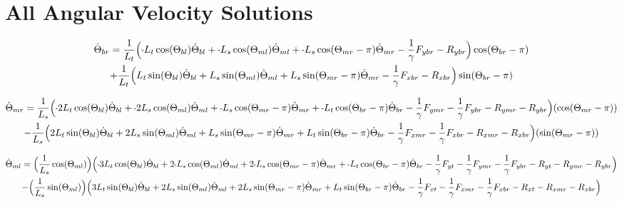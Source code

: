 \documentclass[11pt, landscape]{article}
\newcommand{\mn}{\scalebox{0.7}[1.0]{-}}
\begin{document}
\clearpage

\section{All Angular Velocity Solutions}

\begin{multline}
\dot{\Theta}_{br} =
\frac{1}{L_{t}}\Big(\mn L_{t}\cos(\Theta_{bl})\dot{\Theta}_{bl} + \mn L_{s}\cos(\Theta_{ml})\dot{\Theta}_{ml} + \mn L_{s}\cos(\Theta_{mr}-\pi)\dot{\Theta}_{mr} - \frac{1}{\gamma}F_{ybr} - R_{ybr} \Big)\cos(\Theta_{br}-\pi) \\
+ \frac{1}{L_{t}}\Big(L_{t}\sin(\Theta_{bl})\dot{\Theta}_{bl} + L_{s}\sin(\Theta_{ml})\dot{\Theta}_{ml} + L_{s}\sin(\Theta_{mr}-\pi)\dot{\Theta}_{mr} - \frac{1}{\gamma}F_{xbr} - R_{xbr} \Big)\sin(\Theta_{br}-\pi)
\end{multline}

\begin{multline}
\dot{\Theta}_{mr} =
\frac{1}{L_{s}} \Big(\mn 2L_{t}\cos(\Theta_{bl})\dot{\Theta}_{bl} + \mn 2L_{s}\cos(\Theta_{ml})\dot{\Theta}_{ml} + \mn L_{s}\cos(\Theta_{mr}-\pi)\dot{\Theta}_{mr} + \mn L_{t}\cos(\Theta_{br}-\pi)\dot{\Theta}_{br}
  - \frac{1}{\gamma}F_{ymr} - \frac{1}{\gamma}F_{ybr} - R_{ymr} - R_{ybr} \Big)(\cos(\Theta_{mr}-\pi))\\
  - \frac{1}{L_{s}}\Big(2L_{t}\sin(\Theta_{bl})\dot{\Theta}_{bl} + 2L_{s}\sin(\Theta_{ml})\dot{\Theta}_{ml} + L_{s}\sin(\Theta_{mr}-\pi)\dot{\Theta}_{mr} + L_{t}\sin(\Theta_{br}-\pi)\dot{\Theta}_{br}
   - \frac{1}{\gamma}F_{xmr} - \frac{1}{\gamma}F_{xbr} - R_{xmr} - R_{xbr} \Big)(\sin(\Theta_{mr}-\pi))
\end{multline}

\begin{multline}
\dot{\Theta}_{ml} =
\Big(\frac{1}{L_s}\cos(\Theta_{ml})\Big) \Big(\mn3L_{t}\cos(\Theta_{bl})\dot{\Theta}_{bl} + 2\mn L_{s}\cos(\Theta_{ml})\dot{\Theta}_{ml} + 2\mn L_{s}\cos(\Theta_{mr}-\pi)\dot{\Theta}_{mr} + \mn L_{t}\cos(\Theta_{br}-\pi)\dot{\Theta}_{br}
- \frac{1}{\gamma}F_{yt } - \frac{1}{\gamma}F_{ymr} - \frac{1}{\gamma}F_{ybr} - R_{yt} - R_{ymr} - R_{ybr} \Big) \\
- \Big(\frac{1}{L_s}\sin(\Theta_{ml})\Big)\Big(3L_{t}\sin(\Theta_{bl})\dot{\Theta}_{bl} + 2L_{s}\sin(\Theta_{ml})\dot{\Theta}_{ml} + 2L_{s}\sin(\Theta_{mr}-\pi)\dot{\Theta}_{mr} + L_{t}\sin(\Theta_{br}-\pi)\dot{\Theta}_{br}
- \frac{1}{\gamma}F_{xt } - \frac{1}{\gamma}F_{xmr} - \frac{1}{\gamma}F_{xbr} - R_{xt } - R_{xmr} - R_{xbr} \Big)
\end{multline}
\end{document}

